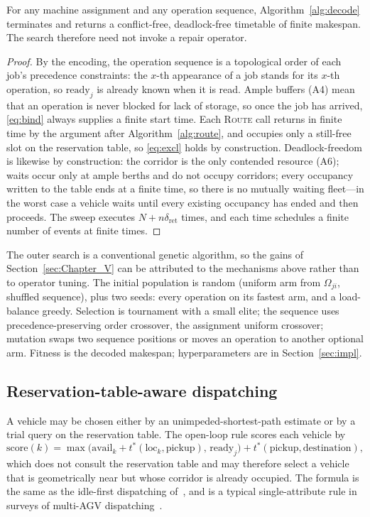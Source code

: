 \begin{prop}
  \label{prop:decodable}
  For any machine assignment and any operation sequence, Algorithm~\ref{alg:decode} terminates and returns a conflict-free, deadlock-free timetable of finite makespan. The search therefore need not invoke a repair operator.
\end{prop}

\begin{proof}
  By the encoding, the operation sequence is a topological order of each job's precedence constraints: the $x$-th appearance of a job stands for its $x$-th operation, so $\mathrm{ready}_j$ is already known when it is read.
  Ample buffers (A4) mean that an operation is never blocked for lack of storage, so once the job has arrived, \eqref{eq:bind} always supplies a finite start time.
  Each \textsc{Route} call returns in finite time by the argument after Algorithm~\ref{alg:route}, and occupies only a still-free slot on the reservation table, so \eqref{eq:excl} holds by construction.
  Deadlock-freedom is likewise by construction: the corridor is the only contended resource (A6); waits occur only at ample berths and do not occupy corridors; every occupancy written to the table ends at a finite time, so there is no mutually waiting fleet---in the worst case a vehicle waits until every existing occupancy has ended and then proceeds.
  The sweep executes $N+n\delta_{\mathrm{ret}}$ times, and each time schedules a finite number of events at finite times.
\end{proof}

The outer search is a conventional genetic algorithm, so the gains of Section~\ref{sec:Chapter_V} can be attributed to the mechanisms above rather than to operator tuning.
The initial population is random (uniform arm from $\Omega_{ji}$, shuffled sequence), plus two seeds: every operation on its fastest arm, and a load-balance greedy.
Selection is tournament with a small elite; the sequence uses precedence-preserving order crossover, the assignment uniform crossover; mutation swaps two sequence positions or moves an operation to another optional arm.
Fitness is the decoded makespan; hyperparameters are in Section~\ref{sec:impl}.

\subsection{Reservation-table-aware dispatching}
\label{sec:dispatch}

A vehicle may be chosen either by an unimpeded-shortest-path estimate or by a trial query on the reservation table.
The open-loop rule scores each vehicle by
\begin{equation}
\label{eq:rule}
\mathrm{score}(k)=\max\bigl(\mathrm{avail}_k+t^{*}(\mathrm{loc}_k,\text{pickup}),\,
\mathrm{ready}_j\bigr)+t^{*}(\text{pickup},\text{destination}),
\end{equation}
which does not consult the reservation table and may therefore select a vehicle that is geometrically near but whose corridor is already occupied.
The formula is the same as the idle-first dispatching of~\cite{li2026framework}, and is a typical single-attribute rule in surveys of multi-AGV dispatching~\cite{lu2022agv}.

